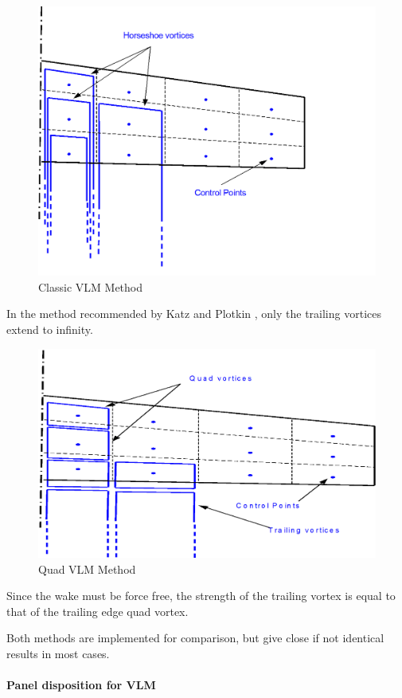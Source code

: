 \documentclass[a4paper,twoside,12pt,dvips]{article}
\begin{document}
\begin{figure}[htbp]
  \includegraphics[width=0.8\linewidth]{img-18}\centering 
  \caption{Classic VLM Method}
  \label{fig:classic_vlm_method}
\end{figure}

In the method recommended by Katz and Plotkin \cite{Katz}, only the
trailing vortices extend to infinity.

\begin{figure}[htbp]
  \includegraphics[width=0.8\linewidth]{img-19}\centering 
  \caption{Quad VLM Method}
  \label{fig:quad_vlm_method}
\end{figure}

Since the wake must be force free, the strength of the trailing vortex
is equal to that of the trailing edge quad vortex.

Both methods are implemented for comparison, but give close if not
identical results in most cases.

\paragraph{Panel disposition for VLM}
\end{document}
